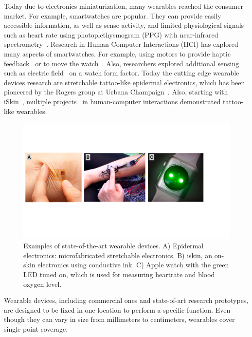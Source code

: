 Today due to electronics miniaturization, many wearables reached the consumer market. For example, smartwatches are popular. They can provide easily accessible information, as well as sense activity, and limited physiological signals such as heart rate using photoplethysmogram (PPG) with near-infrared spectrometry~\cite{phan2015smartwatch}. Research in Human-Computer Interactions (HCI) has explored many aspects of smartwatches. For example, using motors to provide haptic feedback~\cite{ion2015skin} or to move the watch~\cite{gong2017cito}. Also, researchers explored additional sensing such as electric field~\cite{zhou2016aurasense} on a watch form factor. Today the cutting edge wearable devices research are stretchable tattoo-like epidermal electronics, which has been pioneered by the Rogers group at Urbana Champaign~\cite{kim2011epidermal}. Also, starting with iSkin~\cite{weigel2015iskin}, multiple projects~\cite{lo2016skintillates,kao2016duoskin} in human-computer interactions demonstrated tattoo-like wearables. 

\begin{figure}[!ht]
\centering
\includegraphics[width=\textwidth]{pictures/chapter2/wearables_basics.pdf}
\caption{Examples of state-of-the-art wearable devices. A) Epidermal electronics: microfabricated stretchable electronics. B) iskin, an on-skin electronics using conductive ink. C) Apple watch with the green LED tuned on, which is used for measuring heartrate and blood oxygen level. }
\label{fig:technologies_size_coverage}
\end{figure}

Wearable devices, including commercial ones and state-of-art research prototypes, are designed to be fixed in one location to perform a specific function. Even though they can vary in size from millimeters to centimeters, wearables cover single point coverage. 

